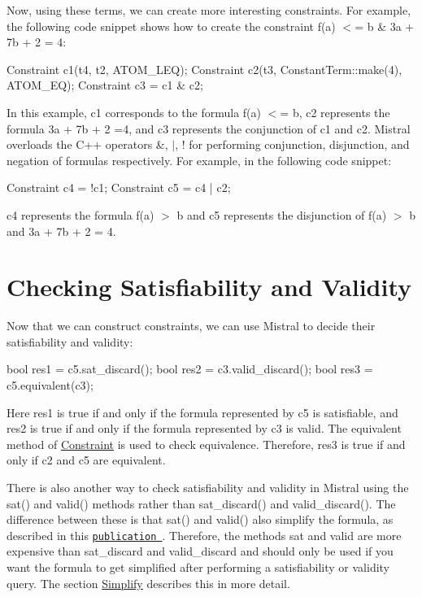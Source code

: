 \-Now, using these terms, we can create more interesting constraints. \-For example, the following code snippet shows how to create the constraint f(a) $<$= b \& 3a + 7b + 2 = 4\-:

\begin{DoxyVerb}
Constraint c1(t4, t2, ATOM_LEQ);
Constraint c2(t3, ConstantTerm::make(4), ATOM_EQ);
Constraint c3 = c1 & c2;
\end{DoxyVerb}


\-In this example, c1 corresponds to the formula f(a) $<$= b, c2 represents the formula 3a + 7b + 2 =4, and c3 represents the conjunction of c1 and c2. \-Mistral overloads the \-C++ operators \&, $|$, ! for performing conjunction, disjunction, and negation of formulas respectively. \-For example, in the following code snippet\-:

\begin{DoxyVerb}
Constraint c4 = !c1;
Constraint c5 = c4 | c2;
\end{DoxyVerb}


c4 represents the formula f(a) $>$ b and c5 represents the disjunction of f(a) $>$ b and 3a + 7b + 2 = 4.\hypertarget{index_sat}{}\section{\-Checking Satisfiability and Validity}\label{index_sat}
\-Now that we can construct constraints, we can use \-Mistral to decide their satisfiability and validity\-:

\begin{DoxyVerb}
bool res1 = c5.sat_discard();
bool res2 = c3.valid_discard();
bool res3 = c5.equivalent(c3);
\end{DoxyVerb}


\-Here res1 is true if and only if the formula represented by c5 is satisfiable, and res2 is true if and only if the formula represented by c3 is valid. \-The equivalent method of \hyperlink{classConstraint}{\-Constraint} is used to check equivalence. \-Therefore, res3 is true if and only if c2 and c5 are equivalent.

\-There is also another way to check satisfiability and validity in \-Mistral using the sat() and valid() methods rather than sat\-\_\-discard() and valid\-\_\-discard(). \-The difference between these is that sat() and valid() also simplify the formula, as described in this \href{http://www.cs.wm.edu/~idillig/sas2010.pdf}{\tt publication }. \-Therefore, the methods sat and valid are more expensive than sat\-\_\-discard and valid\-\_\-discard and should only be used if you want the formula to get simplified after performing a satisfiability or validity query. \-The section \hyperlink{simplify}{\-Simplify} describes this in more detail.

